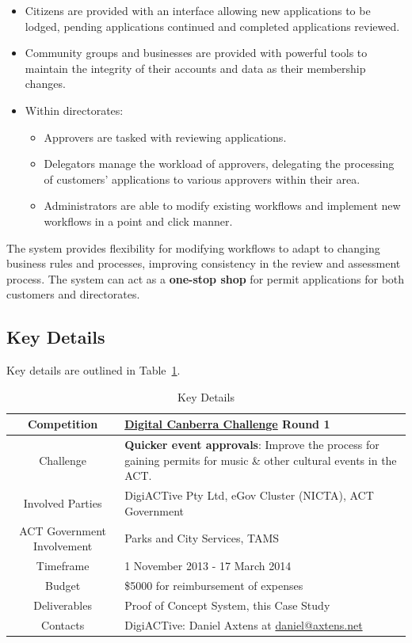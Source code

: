 \documentclass[12pt,a4paper,twosided]{article}
\begin{document}
\begin{itemize}

\item
  Citizens are provided with an interface allowing new applications to
  be lodged, pending applications continued and completed applications
  reviewed.
\item
  Community groups and businesses are provided with powerful tools to
  maintain the integrity of their accounts and data as their membership
  changes.
\item
  Within directorates:
\begin{itemize}
\item
  Approvers are tasked with reviewing applications.
\item
  Delegators manage the workload of approvers, delegating the processing
  of customers' applications to various approvers within their area.
\item
  Administrators are able to modify existing workflows and implement new
  workflows in a point and click manner.
\end{itemize}
\end{itemize}

The system provides flexibility for modifying workflows to adapt to
changing business rules and processes, improving consistency in the
review and assessment process. The system can act as a \textbf{one-stop
shop} for permit applications for both customers and directorates.

\subsection{Key Details}

Key details are outlined in Table~\ref{tab:keydetails}. 


\begin{table}[h!]
  \centering
  \begin{tabular}{|c|p{}|}
    \hline
Competition & \href{http://digitalcanberrachallenge.com.au}{Digital Canberra Challenge} Round 1 \\ \hline
Challenge & \textbf{Quicker event approvals}: Improve the process for gaining permits for music \& other cultural events in the ACT. \\ \hline
Involved Parties & DigiACTive Pty Ltd, eGov Cluster (NICTA), ACT
Government \\ \hline
ACT Government Involvement & Parks and City Services, TAMS \\ \hline
Timeframe & 1 November 2013 - 17 March 2014 \\ \hline
Budget & \$5000 for reimbursement of expenses \\ \hline
Deliverables & Proof of Concept System, this Case Study \\ \hline
Contacts & DigiACTive: Daniel Axtens at
\href{mailto:daniel@axtens.net}{\href{mailto:daniel@axtens.net}{daniel@axtens.net}} \\ \hline
  \end{tabular}
  \caption{Key Details}
  \label{tab:keydetails}
\end{table}
\end{document}
